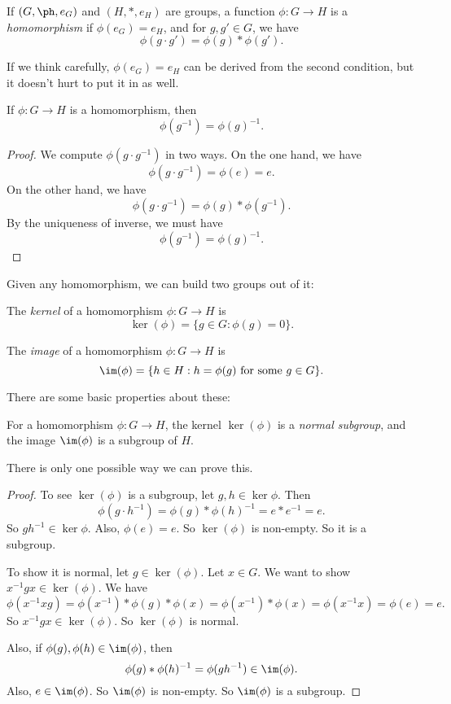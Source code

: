 \documentclass[a4paper]{article}
\begin{document}
\begin{defi}[Homomorphism]
  If $(G, \ph, e_G)$ and $(H, *, e_H)$ are groups, a function $\phi: G\to H$ is a \emph{homomorphism} if $\phi(e_G) = e_H$, and for $g, g' \in G$, we have
  \[
    \phi(g \cdot g') = \phi(g) * \phi(g').
  \]
\end{defi}
If we think carefully, $\phi(e_G) = e_H$ can be derived from the second condition, but it doesn't hurt to put it in as well.

\begin{lemma}
  If $\phi: G \to H$ is a homomorphism, then
  \[
    \phi(g^{-1}) = \phi(g)^{-1}.
  \]
\end{lemma}

\begin{proof}
  We compute $\phi(g\cdot g^{-1})$ in two ways. On the one hand, we have
  \[
    \phi(g\cdot g^{-1}) = \phi(e) = e.
  \]
  On the other hand, we have
  \[
    \phi(g\cdot g^{-1}) = \phi(g) * \phi(g^{-1}).
  \]
  By the uniqueness of inverse, we must have
  \[
    \phi(g^{-1}) = \phi(g)^{-1}.
  \]
\end{proof}

Given any homomorphism, we can build two groups out of it:
\begin{defi}[Kernel]
  The \emph{kernel} of a homomorphism $\phi: G \to H$ is
  \[
    \ker(\phi) = \{g \in G: \phi(g) = 0\}.
  \]
\end{defi}

\begin{defi}[Image]
  The \emph{image} of a homomorphism $\phi: G \to H$ is
  \[
    \im (\phi) = \{h\in H: h = \phi(g) \text{ for some }g \in G\}.
  \]
\end{defi}

There are some basic properties about these:
\begin{lemma}
  For a homomorphism $\phi: G\to H$, the kernel $\ker (\phi)$ is a \emph{normal subgroup}, and the image $\im (\phi)$ is a subgroup of $H$.
\end{lemma}

There is only one possible way we can prove this.
\begin{proof}
  To see $\ker(\phi)$ is a subgroup, let $g, h \in \ker \phi$. Then
  \[
    \phi(g\cdot h^{-1}) = \phi(g) * \phi(h)^{-1} = e * e^{-1} = e.
  \]
  So $gh^{-1} \in \ker \phi$. Also, $\phi(e) = e$. So $\ker(\phi)$ is non-empty. So it is a subgroup.

  To show it is normal, let $g \in \ker(\phi)$. Let $x \in G$. We want to show $x^{-1}gx \in \ker(\phi)$. We have
  \[
    \phi(x^{-1} xg) = \phi(x^{-1}) * \phi(g) * \phi(x) = \phi(x^{-1}) * \phi(x) = \phi(x^{-1}x) = \phi(e) = e.
  \]
  So $x^{-1}gx \in \ker(\phi)$. So $\ker(\phi)$ is normal.

  Also, if $\phi(g), \phi(h) \in \im (\phi)$, then
  \[
    \phi(g) * \phi(h)^{-1} = \phi(gh^{-1}) \in \im (\phi).
  \]
  Also, $e \in \im(\phi)$. So $\im(\phi)$ is non-empty. So $\im(\phi)$ is a subgroup.
\end{proof}
\end{document}
